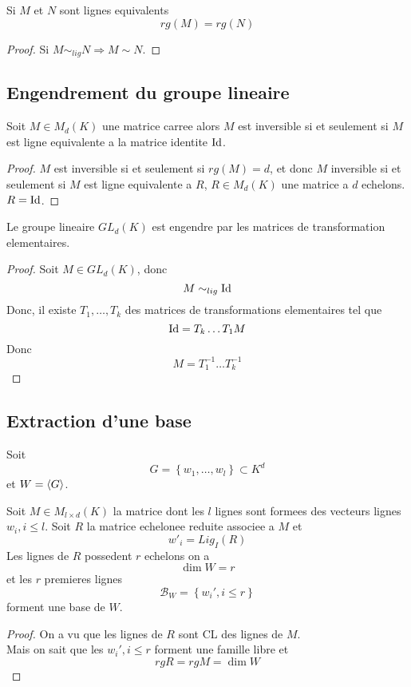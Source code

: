 \documentclass[../main.tex]{subfiles}
\begin{document}
\begin{propo}
Si $M$ et $N$ sont lignes equivalents
\[ 
	rg( M) = rg( N) 
\]

\end{propo}
\begin{proof}
Si $M \sim_{ lig } N \Rightarrow M \sim N $.
\end{proof}
\subsection{Engendrement du groupe lineaire}
\begin{propo}
	Soit $M \in M_d( K) $ une matrice carree alors $M$ est inversible si et seulement si $M$ est ligne equivalente a la matrice identite $\operatorname*{Id}$.
\end{propo}
\begin{proof}
	$M$ est inversible si et seulement si $rg( M) =d$, et donc $M$ inversible si et seulement si $M$ est ligne equivalente a $R$, $R \in M_d( K) $ une matrice a $d$ echelons.\\
	$R= \operatorname*{Id}$.
\end{proof}
\begin{crly}
	Le groupe lineaire $GL_d( K) $ est engendre par les matrices de transformation elementaires.
\end{crly}
\begin{proof}
	Soit $M \in GL_d( K)$, donc
	\[ 
	M \sim_{lig} \operatorname*{Id}
	\]
	Donc, il existe $T_1, \ldots ,T_k$ des matrices de transformations elementaires tel que
	\[ 
	\operatorname*{Id} = T_k \ldots T_1 M
	\]
	Donc
	\[ 
	M = T_1^{-1}\ldots T_k^{-1}
	\]
	
\end{proof}

\subsection{Extraction d'une base}
Soit 
\[ 
G = \left\{ w_1, \ldots , w_l \right\} \subset K^{d}
\]
et $W = \left\langle G\right\rangle$.
\begin{propo}
	Soit $M \in M_{l\times d} ( K) $ la matrice dont les $l$ lignes sont formees des vecteurs lignes $w_i, i \leq l$. Soit $R$ la matrice echelonee reduite associee a $M$ et 
	\[ 
		w'_i = Lig_I( R) 
	\]
	Les lignes de $R$ possedent $r$ echelons on a
	\[ 
	\dim W = r
	\]
	et les $r$ premieres lignes
	\[ 
	\mathcal{B} _W = \left\{ w_i', i \leq r \right\} 
	\]
	forment une base de $W$.
\end{propo}
\begin{proof}
On a vu que les lignes de $R$ sont CL des lignes de $M$.\\
Mais on sait que les $w_i', i \leq r$ forment une famille libre et 
\[ 
rg R = rg M = \dim W
\]

\end{proof}
\end{document}
